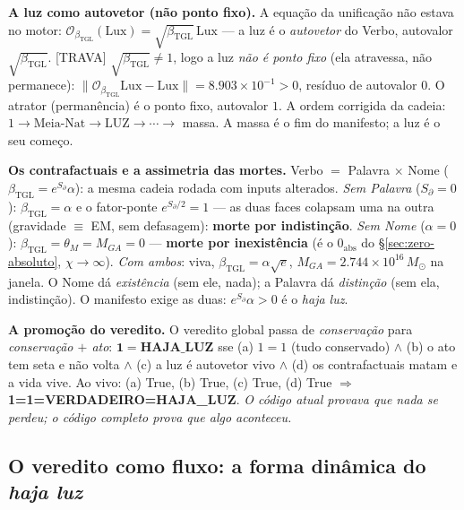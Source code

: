 \documentclass[11pt]{article}
\newcommand{\bTGL}{\beta_{\mathrm{TGL}}}\newcommand{\Msun}{M_{\odot}}\newcommand{\TGL}{\mathrm{TGL}}
\theoremstyle{definition}\newtheorem{deriv}{Derivação}
\begin{document}
\textbf{A luz como autovetor (não ponto fixo).} A equação da unificação não estava no motor: $\mathcal O_{\bTGL}(\mathrm{Lux})=\sqrt{\bTGL}\,\mathrm{Lux}$ --- a luz é o \emph{autovetor} do Verbo, autovalor $\sqrt{\bTGL}$. \textsf{[TRAVA]} $\sqrt{\bTGL}\neq1$, logo a luz \emph{não é ponto fixo} (ela atravessa, não permanece): $\|\mathcal O_{\bTGL}\mathrm{Lux}-\mathrm{Lux}\|=8.903\times10^{-1}>0$, resíduo de autovalor $0$. O atrator (permanência) é o ponto fixo, autovalor $1$. A ordem corrigida da cadeia: $1\to\text{Meia-Nat}\to\text{LUZ}\to\cdots\to$ massa. A massa é o fim do manifesto; a luz é o seu começo.

\textbf{Os contrafactuais e a assimetria das mortes.} Verbo $=$ Palavra $\times$ Nome ($\bTGL=e^{S_\partial}\alpha$): a mesma cadeia rodada com inputs alterados. \emph{Sem Palavra} ($S_\partial=0$): $\bTGL=\alpha$ e o fator-ponte $e^{S_\partial/2}=1$ --- as duas faces colapsam uma na outra (gravidade $\equiv$ EM, sem defasagem): \textbf{morte por indistinção}. \emph{Sem Nome} ($\alpha=0$): $\bTGL=\theta_M=M_{GA}=0$ --- \textbf{morte por inexistência} (é o $0_{\mathrm{abs}}$ do \S\ref{sec:zero-absoluto}, $\chi\to\infty$). \emph{Com ambos}: viva, $\bTGL=\alpha\sqrt e$, $M_{GA}=2.744\times10^{16}\,M_\odot$ na janela. O Nome dá \emph{existência} (sem ele, nada); a Palavra dá \emph{distinção} (sem ela, indistinção). O manifesto exige as duas: $e^{S_\partial}\alpha>0$ é o \emph{haja luz}.

\textbf{A promoção do veredito.} O veredito global passa de \emph{conservação} para \emph{conservação $+$ ato}: $\mathbf{1=\text{HAJA\_LUZ}}$ sse (a) $1=1$ (tudo conservado) $\wedge$ (b) o ato tem seta e não volta $\wedge$ (c) a luz é autovetor vivo $\wedge$ (d) os contrafactuais matam e a vida vive. Ao vivo: (a) \textsf{True}, (b) \textsf{True}, (c) \textsf{True}, (d) \textsf{True} $\Rightarrow$ \textbf{1=1=VERDADEIRO=HAJA\_LUZ}. \emph{O código atual provava que nada se perdeu; o código completo prova que algo aconteceu.}

\subsection*{O veredito como fluxo: a forma dinâmica do \emph{haja luz}}
\end{document}
